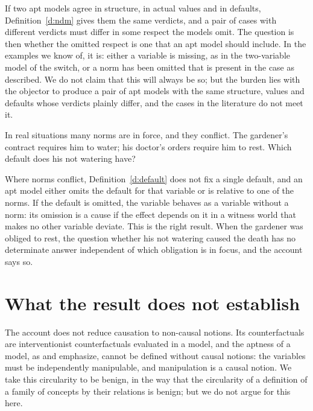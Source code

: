 \documentclass{situationist-preprint}
\begin{document}
\begin{reply}
If two apt models agree in structure, in actual values and in defaults, Definition~\ref{d:ndm} gives them the same verdicts, and a pair of cases with different verdicts must differ in some respect the models omit. The question is then whether the omitted respect is one that an apt model should include. In the examples we know of, it is: either a variable is missing, as in the two-variable model of the switch, or a norm has been omitted that is present in the case as described. We do not claim that this will always be so; but the burden lies with the objector to produce a pair of apt models with the same structure, values and defaults whose verdicts plainly differ, and the cases in the literature do not meet it.
\end{reply}

\begin{objection}
In real situations many norms are in force, and they conflict. The gardener's contract requires him to water; his doctor's orders require him to rest. Which default does his not watering have?
\end{objection}

\begin{reply}
Where norms conflict, Definition~\ref{d:default} does not fix a single default, and an apt model either omits the default for that variable or is relative to one of the norms. If the default is omitted, the variable behaves as a variable without a norm: its omission is a cause if the effect depends on it in a witness world that makes no other variable deviate. This is the right result. When the gardener was obliged to rest, the question whether his not watering caused the death has no determinate answer independent of which obligation is in focus, and the account says so.
\end{reply}

\section{What the result does not establish}\label{s:limits}

The account does not reduce causation to non-causal notions. Its counterfactuals are interventionist counterfactuals evaluated in a model, and the aptness of a model, as \citet{Woodward2003} and \citet{HalpernHitchcock2010} emphasize, cannot be defined without causal notions: the variables must be independently manipulable, and manipulation is a causal notion. We take this circularity to be benign, in the way that the circularity of a definition of a family of concepts by their relations is benign; but we do not argue for this here.
\end{document}
